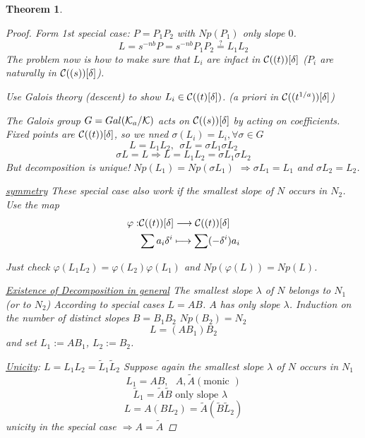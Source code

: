\documentclass[11pt]{article}
\newtheorem{thm}{Theorem}[section]
\newcommand{\calc}{{\cal C}}
\newcommand{\calk}{{\cal K}}
\newcommand{\Lrta}{\Longrightarrow}
\newcommand{\lrta}{\longrightarrow}
\begin{document}
\begin{thm}
\begin{proof}

Form 1st special case: $P=P_1P_2$ with $Np(P_1)$ only slope $0$.
$$
L=s^{-nb}P=s^{-nb}P_1P_2\overset{?}{=}L_1L_2
$$
The problem now is how to make sure that $L_i$ are infact in $\calc((t))[\delta]$ ($P_i$ are naturally in $\calc((s))[\delta]$).

Use Galois theory (descent) to show $L_i\in \calc((t)[\delta])$. (a priori in  $\calc((t^{1/a}))[\delta]$)

The Galois group $G=Gal(\calk_a/\calk)$ acts on $\calc((s))[\delta]$ by acting on coefficients. Fixed points are $\calc((t))[\delta]$, so we nned $\sigma(L_i)=L_i,\forall \sigma\in G$
$$
L=L_1L_2,\ \ \sigma L=\sigma L_1\sigma L_2
$$
$$
\sigma L=L\Lrta L=L_1L_2=\sigma L_1\sigma L_2
$$
But decomposition is unique! $Np(L_1)=Np(\sigma L_1)$ $\Lrta \sigma L_1=L_1$ and $\sigma L_2=L_2$.

\underline{symmetry} These special case also work if the smallest slope of $N$ occurs in $N_2$. Use the map
$$
\begin{aligned}
\varphi:&\calc((t))[\delta]\lrta \calc((t))[\delta]\\
& \sum a_i\delta^i\longmapsto \sum(-\delta^i)a_i
\end{aligned}
$$

Just check $\varphi(L_1L_2)=\varphi(L_2)\varphi(L_1)$ and $Np(\varphi(L))=Np(L)$.


\underline{Existence of Decomposition in general} The smallest slope $\lambda$ of $N$ belongs to $N_1$ (or to $N_2$) According to special cases $L=AB$. $A$ has only slope $\lambda$. Induction on the number of distinct slopes
$B=B_1B_2$ $Np(B_2)=N_2$
$$
L=(AB_1)B_2
$$ 
and set $L_1:=AB_1$, $L_2:=B_2$.

\underline{Unicity}: $L=L_1L_2=\tilde{L}_1\tilde{L}_2$ Suppose again the smallest slope $\lambda$ of $N$ occurs in $N_1$
$$
L_1=AB,\ \ \ A,\tilde{A} (\text{monic })
$$
$$
\tilde{L}_1=\tilde{A}\tilde{B}\text{ only slope $\lambda$ }
$$
$$
L=A(BL_2)=\tilde{A}(\tilde{B}\tilde{L}_2)
$$
unicity in the special case $\Lrta A=\tilde{A}$


\end{proof}
\end{thm}
\end{document}
